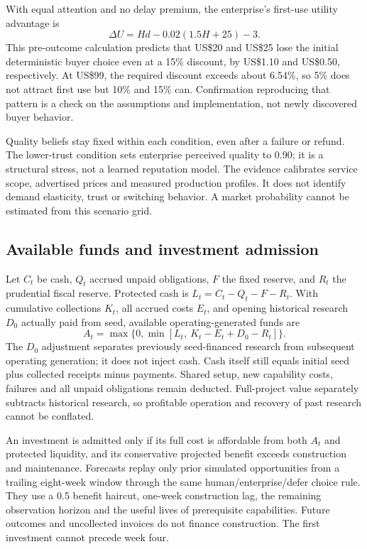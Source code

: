 \documentclass[11pt,letterpaper]{article}
\newcommand{\usd}[1]{US\$#1}
\begin{document}
With equal attention and no delay premium, the enterprise's first-use utility advantage is
\begin{equation}
\Delta U = H d-0.02(1.5H+25)-3.
\label{eq:buyer}
\end{equation}
This pre-outcome calculation predicts that \usd{20} and \usd{25} lose the initial deterministic buyer choice even at a 15\% discount, by \usd{1.10} and \usd{0.50}, respectively. At \usd{99}, the required discount exceeds about 6.54\%, so 5\% does not attract first use but 10\% and 15\% can. Confirmation reproducing that pattern is a check on the assumptions and implementation, not newly discovered buyer behavior.

Quality beliefs stay fixed within each condition, even after a failure or refund. The lower-trust condition sets enterprise perceived quality to 0.90; it is a structural stress, not a learned reputation model. The evidence calibrates service scope, advertised prices and measured production profiles. It does not identify demand elasticity, trust or switching behavior. A market probability cannot be estimated from this scenario grid.

\subsection{Available funds and investment admission}
Let $C_t$ be cash, $Q_t$ accrued unpaid obligations, $F$ the fixed reserve, and $R_t$ the prudential fiscal reserve. Protected cash is $L_t=C_t-Q_t-F-R_t$. With cumulative collections $K_t$, all accrued costs $E_t$, and opening historical research $D_0$ actually paid from seed, available operating-generated funds are
\begin{equation}
A_t=\max\{0,\min[L_t,\ K_t-E_t+D_0-R_t]\}.
\label{eq:funds}
\end{equation}
The $D_0$ adjustment separates previously seed-financed research from subsequent operating generation; it does not inject cash. Cash itself still equals initial seed plus collected receipts minus payments. Shared setup, new capability costs, failures and all unpaid obligations remain deducted. Full-project value separately subtracts historical research, so profitable operation and recovery of past research cannot be conflated.

An investment is admitted only if its full cost is affordable from both $A_t$ and protected liquidity, and its conservative projected benefit exceeds construction and maintenance. Forecasts replay only prior simulated opportunities from a trailing eight-week window through the same human/enterprise/defer choice rule. They use a 0.5 benefit haircut, one-week construction lag, the remaining observation horizon and the useful lives of prerequisite capabilities. Future outcomes and uncollected invoices do not finance construction. The first investment cannot precede week four.
\end{document}
